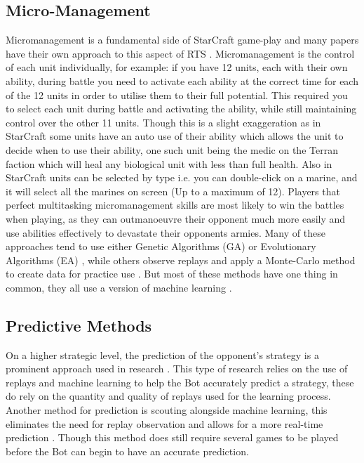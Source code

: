 \documentclass[journal]{IEEEtran}
\begin{document}
\subsection{Micro-Management}
Micromanagement is a fundamental side of StarCraft game-play and many papers have their own approach to this aspect of RTS \cite{SOMA,EffectiveMicro,Swarm,MM,SpecialTactics,UnitsControl}. Micromanagement is the control of each unit individually, for example: if you have 12 units, each with their own ability, during battle you need to activate each ability at the correct time for each of the 12 units in order to utilise them to their full potential. This required you to select each unit during battle and activating the ability, while still maintaining control over the other 11 units. Though this is a slight exaggeration as in StarCraft some units have an auto use of their ability which allows the unit to decide when to use their ability, one such unit being the medic on the Terran faction which will heal any biological unit with less than full health. Also in StarCraft units can be selected by type i.e. you can double-click on a marine, and it will select all the marines on screen (Up to a maximum of 12). Players that perfect multitasking micromanagement skills are most likely to win the battles when playing, as they can outmanoeuvre their opponent much more easily and use abilities effectively to devastate their opponents armies. Many of these approaches tend to use either Genetic Algorithms (GA) or Evolutionary Algorithms (EA) \cite{SOMA, EffectiveMicro, Swarm}, while others observe replays and apply a Monte-Carlo method to create data for practice use \cite{MM}. But most of these methods have one thing in common, they all use a version of machine learning \cite{Survey}.

\subsection{Predictive Methods}
On a higher strategic level, the prediction of the opponent's strategy is a prominent approach used in research \cite{DataMine, Bayesian, Scouting, ReplayPred}. This type of research relies on the use of replays and machine learning to help the Bot accurately predict a strategy, these do rely on the quantity and quality of replays used for the learning process\cite{DataMine,Bayesian,ReplayPred}. Another method for prediction is scouting alongside machine learning, this eliminates the need for replay observation and allows for a more real-time prediction \cite{Scouting}. Though this method does still require several games to be played before the Bot can begin to have an accurate prediction.
\end{document}
